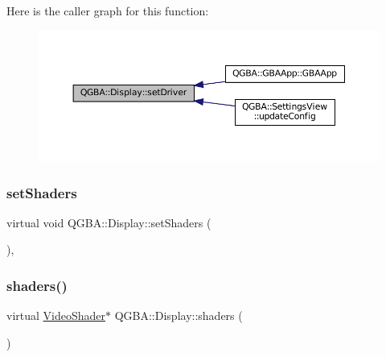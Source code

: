 Here is the caller graph for this function\+:
\nopagebreak
\begin{figure}[H]
\begin{center}
\leavevmode
\includegraphics[width=350pt]{class_q_g_b_a_1_1_display_a4b8340f7f99e587acb59e1cc6a0ef1ca_icgraph}
\end{center}
\end{figure}
\mbox{\label{class_q_g_b_a_1_1_display_a9f50f9d1cd9bcb0b4b11999f022f27c0}} 
\subsubsection{\texorpdfstring{set\+Shaders}{setShaders}}
{\footnotesize\ttfamily virtual void Q\+G\+B\+A\+::\+Display\+::set\+Shaders (\begin{DoxyParamCaption}\item[{struct V\+Dir $\ast$}]{ }\end{DoxyParamCaption})\hspace{0.3cm}{\ttfamily [pure virtual]}, {\ttfamily [slot]}}

\mbox{\label{class_q_g_b_a_1_1_display_a540a06ee94dbfcd93fb1b2a7e2d0bbf8}} 
\subsubsection{\texorpdfstring{shaders()}{shaders()}}
{\footnotesize\ttfamily virtual \mbox{\hyperlink{video-backend_8h_struct_video_shader}{Video\+Shader}}$\ast$ Q\+G\+B\+A\+::\+Display\+::shaders (\begin{DoxyParamCaption}{ }\end{DoxyParamCaption})\hspace{0.3cm}{\ttfamily [pure virtual]}}



